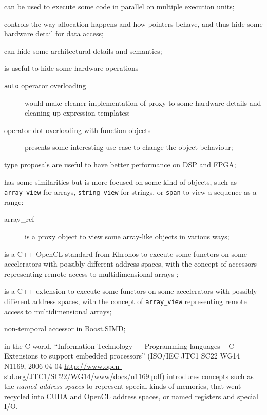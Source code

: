 \documentclass[a4paper]{article}
\begin{document}
\begin{description}
\item[\texttt{thread}] can be used to execute some code in parallel
  on multiple execution units;
\item[\texttt{allocator}] controls the way allocation happens and how
  pointers behave, and thus hide some hardware detail for data access;
\item[constructors and destructors] can hide some architectural details
  and semantics;
\item[operator overloading] is useful to hide some hardware
  operations
  \begin{description}
  \item[\texttt{auto} operator overloading] would make cleaner
    implementation of proxy to some hardware details and cleaning up
    expression templates;
  \item[operator dot overloading with function objects]
    \cite{C++:P0060R0:function_operator_dot} presents some interesting
    use case to change the object behaviour;
  \end{description}
\item[fixed-point] type proposals are useful to have better
  performance on DSP and FPGA;
\item[the concept of view] has some similarities but is more focused
  on some kind of objects, such as \lstinline|array_view| for arrays,
  \lstinline|string_view| for strings, or \lstinline|span| to view a
  sequence as a range:
  \begin{description}
  \item[array\_ref] \cite{C++:P0009R1:array_ref} is a proxy object to
    view some array-like objects in various ways;
  \end{description}
\item[SYCL] is a C++ OpenCL standard from Khronos to execute some
  functors on some accelerators with possibly different address
  spaces, with the concept of accessors representing remote access to
  multidimensional arrays \cite{C++:P00236R0:SYCL};
\item[C++AMP] is a C++ extension to execute some functors on some
  accelerators with possibly different address spaces, with the
  concept of \lstinline|array_view| representing remote access to
  multidimensional arrays;
\item non-temporal accessor in Boost.SIMD;
\item[ISO/IEC TR 18037] in the C world, ``Information Technology ---
  Programming languages -- C -- Extensions to support embedded
  processors'' (ISO/IEC JTC1 SC22 WG14 N1169, 2006-04-04
  \url{http://www.open-std.org/JTC1/SC22/WG14/www/docs/n1169.pdf})
  introduces concepts such as the \emph{named address spaces} to
  represent special kinds of memories, that went recycled into CUDA
  and OpenCL address spaces, or named registers and special I/O.
\end{description}
\end{document}
